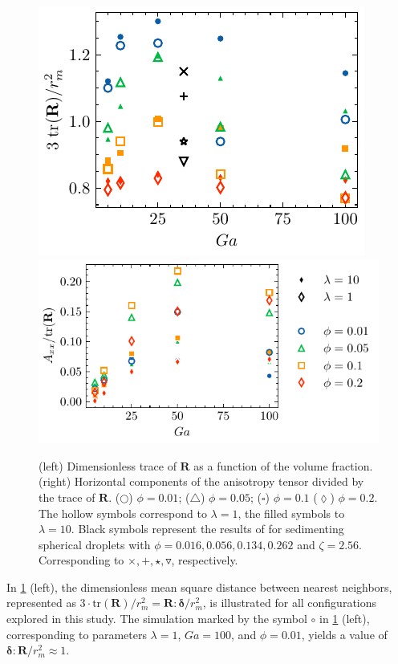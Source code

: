 \begin{figure}[h!]
    \centering
    \includegraphics[height=0.3\textwidth]{image/HOMOGENEOUS_NEW/PA/trR.pdf}
    \includegraphics[height=0.3\textwidth]{image/HOMOGENEOUS_NEW/PA/Axx.pdf}
    \caption{
        (left) Dimensionless trace of $\textbf{R}$ as a function of the volume fraction.%
        (right) Horizontal components of the anisotropy tensor divided by the trace of $\textbf{R}$. %
    ($\pmb\bigcirc$) $\phi = 0.01$; ($\pmb\triangle$) $ \phi = 0.05$; ($\pmb\square$) $\phi = 0.1$ ($\pmb\lozenge$) $\phi = 0.2$.
    The hollow symbols correspond to $\lambda = 1$, the filled symbols to $\lambda = 10$.
    Black symbols represent the results of \citet{zhang2023evolution} for sedimenting spherical droplets with $\phi = 0.016,0.056,0.134,0.262$ and $\zeta = 2.56$. %
    Corresponding to $\pmb\times,\pmb +, \pmb\star , \pmb\triangledown$, respectively.
    }
    \label{fig:A}
\end{figure}
In \ref{fig:A} (left), the dimensionless mean square distance between nearest neighbors, represented as $3\cdot\text{tr}(\textbf{R})/r_m^2 = \textbf{R}:\bm\delta/r_m^2$, is illustrated for all configurations explored in this study. 
The simulation marked by the symbol \textcolor{col1}{$\pmb\circ$} in \ref{fig:A} (left), corresponding to parameters $\lambda = 1$, $Ga = 100$, and $\phi = 0.01$, yields a value of $\bm\delta:\textbf{R}/r_m^2 \approx 1$. 
